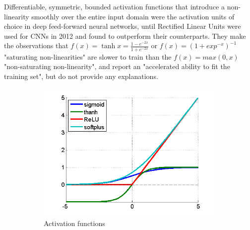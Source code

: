 \documentclass[a4paper,11pt]{article}
\begin{document}
Differentiable, symmetric, bounded activation functions that introduce a non-linearity smoothly over the entire input domain were the activation units of choice in deep feed-forward neural networks, until Rectified Linear Units were used for CNNs in 2012 \cite{krizhevsky} and found to outperform their counterparts. They make the observations that $f(x) = \tanh x = \frac{1 - e^{-2x}}{1 + e^{-2x}}$ or $f(x) = (1+ exp^{-x})^{-1}$ "saturating non-linearities" are slower to train than the $f(x) = max(0,x)$ "non-saturating non-linearity", and report an "accelerated ability to fit the training set", but do not provide any explanations.   \\

\begin{figure}
    \centering
    \begin{minipage}[b]{\textwidth}
      \begin{subfigure}{.5\textwidth} 
        \centering
        \includegraphics[scale=0.5]{images/activation_functions.png}
        \caption{Activation functions}\label{fig:2a}
      \end{subfigure}%
      \begin{subfigure}{.5\textwidth} 
        \centering

\end{subfigure}
\end{minipage}
\end{figure}
\end{document}
